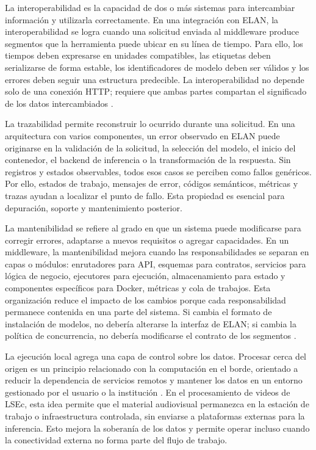La interoperabilidad es la capacidad de dos o más sistemas para intercambiar información y utilizarla correctamente. En una integración con ELAN, la interoperabilidad se logra cuando una solicitud enviada al middleware produce segmentos que la herramienta puede ubicar en su línea de tiempo. Para ello, los tiempos deben expresarse en unidades compatibles, las etiquetas deben serializarse de forma estable, los identificadores de modelo deben ser válidos y los errores deben seguir una estructura predecible. La interoperabilidad no depende solo de una conexión HTTP; requiere que ambas partes compartan el significado de los datos intercambiados \cite{fielding2000rest}.

La trazabilidad permite reconstruir lo ocurrido durante una solicitud. En una arquitectura con varios componentes, un error observado en ELAN puede originarse en la validación de la solicitud, la selección del modelo, el inicio del contenedor, el backend de inferencia o la transformación de la respuesta. Sin registros y estados observables, todos esos casos se perciben como fallos genéricos. Por ello, estados de trabajo, mensajes de error, códigos semánticos, métricas y trazas ayudan a localizar el punto de fallo. Esta propiedad es esencial para depuración, soporte y mantenimiento posterior.

La mantenibilidad se refiere al grado en que un sistema puede modificarse para corregir errores, adaptarse a nuevos requisitos o agregar capacidades. En un middleware, la mantenibilidad mejora cuando las responsabilidades se separan en capas o módulos: enrutadores para API, esquemas para contratos, servicios para lógica de negocio, ejecutores para ejecución, almacenamiento para estado y componentes específicos para Docker, métricas y cola de trabajos. Esta organización reduce el impacto de los cambios porque cada responsabilidad permanece contenida en una parte del sistema. Si cambia el formato de instalación de modelos, no debería alterarse la interfaz de ELAN; si cambia la política de concurrencia, no debería modificarse el contrato de los segmentos \cite{iso25010}.

La ejecución local agrega una capa de control sobre los datos. Procesar cerca del origen es un principio relacionado con la computación en el borde, orientado a reducir la dependencia de servicios remotos y mantener los datos en un entorno gestionado por el usuario o la institución \cite{shi2016edge}. En el procesamiento de videos de LSEc, esta idea permite que el material audiovisual permanezca en la estación de trabajo o infraestructura controlada, sin enviarse a plataformas externas para la inferencia. Esto mejora la soberanía de los datos y permite operar incluso cuando la conectividad externa no forma parte del flujo de trabajo.

